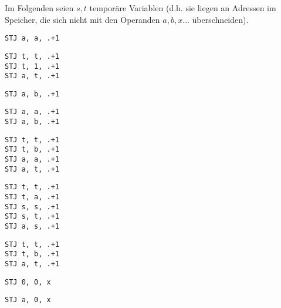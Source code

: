 \documentclass[a4paper,11pt]{article}             %
\begin{document}
\setcounter{excnt}{13}
\begin{ex}
  \leavevmode
  \begin{exlist}
  \item Im Folgenden seien $s, t$ temporäre Variablen (d.h. sie liegen an
    Adressen im Speicher, die sich nicht mit den Operanden $a, b,x\dots$ überschneiden).
  \begin{multicols}{2}
  \begin{exlist}
  \item
    \begin{lstlisting}
STJ a, a, .+1 
    \end{lstlisting}

  \item
    \begin{lstlisting}
STJ t, t, .+1
STJ t, 1, .+1
STJ a, t, .+1
    \end{lstlisting}
    
  \item
    \begin{lstlisting}
STJ a, b, .+1
    \end{lstlisting}

  \item
    \begin{lstlisting}
STJ a, a, .+1
STJ a, b, .+1
    \end{lstlisting}

  \item
    \begin{lstlisting}
STJ t, t, .+1
STJ t, b, .+1
STJ a, a, .+1
STJ a, t, .+1
    \end{lstlisting}
    
  \item
    \begin{lstlisting}
STJ t, t, .+1
STJ t, a, .+1
STJ s, s, .+1
STJ s, t, .+1
STJ a, s, .+1
    \end{lstlisting}
    
  \item
    \begin{lstlisting}
STJ t, t, .+1
STJ t, b, .+1
STJ a, t, .+1
    \end{lstlisting}
    
  \item
    \begin{lstlisting}
STJ 0, 0, x
    \end{lstlisting}
    
  \item
    \begin{lstlisting}
STJ a, 0, x
    \end{lstlisting}
    

\end{exlist}
\end{multicols}
\end{exlist}
\end{ex}
\end{document}
